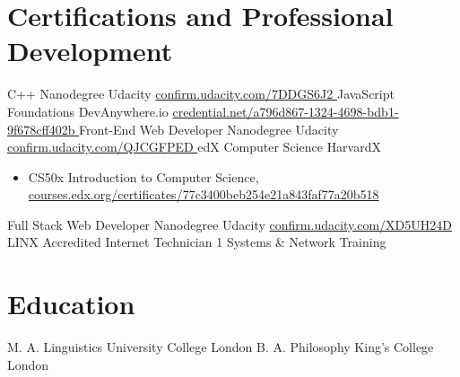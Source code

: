 \documentclass[10pt,a4paper,sans]{moderncv} %
\begin{document}

\section{Certifications and Professional Development}

        {C++ Nanodegree}
        {Udacity}{}
        { \href{ https://confirm.udacity.com/7DDGS6J2 }{ confirm.udacity.com/7DDGS6J2 } }
        {}
        {JavaScript Foundations}
        {DevAnywhere.io}{}
        { \href{ https://www.credential.net/a796d867-1324-4698-bdb1-9f678cff402b }{ credential.net/a796d867-1324-4698-bdb1-9f678cff402b } }
        {}
        {Front-End Web Developer Nanodegree}
        {Udacity}{}
        { \href{ https://confirm.udacity.com/QJCGFPED }{ confirm.udacity.com/QJCGFPED } }
        {}
        {edX Computer Science}
        {HarvardX}{}
        {}
        {            \begin{itemize}
                \item{ CS50x Introduction to Computer Science, \href{ https://courses.edx.org/certificates/77c3400beb254e21a843faf77a20b518 }{ courses.edx.org/certificates/77c3400beb254e21a843faf77a20b518 } }
            \end{itemize}
}
        {Full Stack Web Developer Nanodegree}
        {Udacity}{}
        { \href{ https://confirm.udacity.com/XD5UH24D }{ confirm.udacity.com/XD5UH24D } }
        {}
        {LINX Accredited Internet Technician 1}
        {Systems \& Network Training}{}
        {}
        {}


\section{Education}

    { M. A. Linguistics}
    { University College London }{}{}{}
    { B. A. Philosophy}
    { King's College London }{}{}{}
\end{document}
